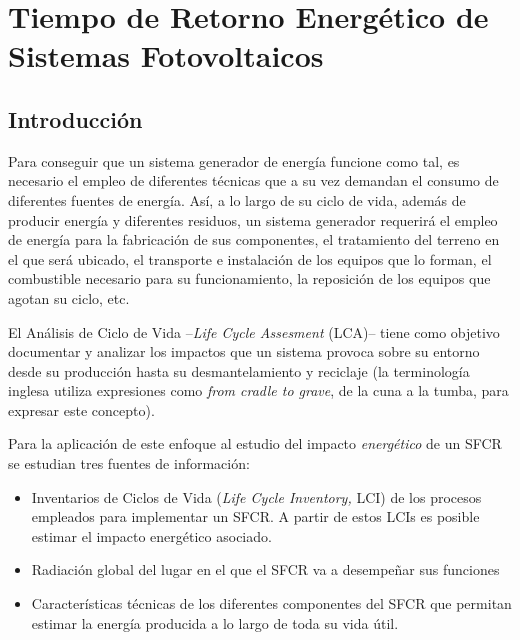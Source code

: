 \chapter{Tiempo de Retorno Energético  de Sistemas
  Fotovoltaicos}
\label{cha:LCA}


\section{Introducción}

Para conseguir que un sistema generador de energía funcione como tal,
es necesario el empleo de diferentes técnicas que a su vez demandan el
consumo de diferentes fuentes de energía. Así, a lo largo de su ciclo
de vida, además de producir energía y diferentes residuos, un sistema
generador requerirá el empleo de energía para la fabricación de sus
componentes, el tratamiento del terreno en el que será ubicado, el
transporte e instalación de los equipos que lo forman, el combustible
necesario para su funcionamiento, la reposición de los equipos que
agotan su ciclo, etc.

El Análisis de Ciclo de Vida --\emph{Life Cycle Assesment} (LCA)--
tiene como objetivo documentar y analizar los impactos que un sistema
provoca sobre su entorno desde su producción hasta su desmantelamiento
y reciclaje (la terminología inglesa utiliza expresiones como \emph{from
cradle to grave}, de la cuna a la tumba, para expresar este concepto).

Para la aplicación de este enfoque al estudio del impacto \emph{energético}
de un SFCR se estudian tres fuentes de información: 

\begin{itemize}

\item Inventarios de Ciclos de Vida (\emph{Life Cycle Inventory,} LCI) de
los procesos empleados para implementar un SFCR. A partir de estos
LCIs es posible estimar el impacto energético asociado.

\item Radiación global del lugar en el que el SFCR va a desempeñar sus funciones

\item Características técnicas de los diferentes componentes del SFCR que
permitan estimar la energía producida a lo largo de toda su vida útil. 

\end{itemize}

